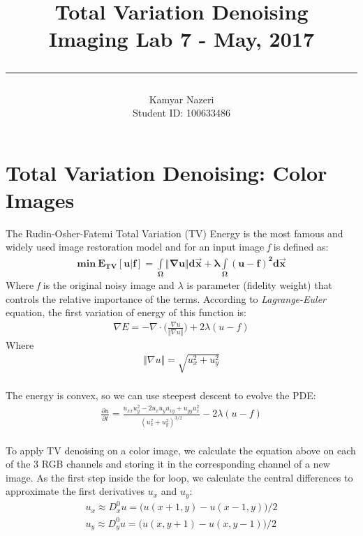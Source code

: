 \documentclass[a4paper,11pt]{article}
\begin{document}
\title{
	\Huge \textbf {Total Variation Denoising}
    \\ [0.2cm]
	\LARGE Imaging Lab 7 - May, 2017
    \\ [0.5cm]
    \hrule
}

\date{}

\author{
		\Large Kamyar Nazeri \\
		\large Student ID: 100633486 }

\maketitle
\newpage

\section*{Total Variation Denoising: Color Images}
The Rudin-Osher-Fatemi Total Variation (TV) Energy is the most famous and widely used image restoration model and for an input image \emph{f} is defined as:
\begin{align*}
\boldsymbol{min\ E_{TV}[u|f] = \int\limits_{\Omega} \Vert\nabla u\Vert d\vec{x} + \lambda \int\limits_{\Omega} (u-f)^2 d\vec{x}}
\end{align*}
Where \emph{f} is the original noisy image and $\lambda$ is parameter (fidelity weight) that controls the relative importance of the terms.
According to \emph{Lagrange-Euler} equation, the first variation of energy of this function is:
\begin{align*}
\nabla E = -\nabla \cdot \bigg(\frac{\nabla u}{\Vert\nabla u\Vert}\bigg) + 2\lambda(u-f)
\end{align*}
Where
\begin{align*}
\Vert\nabla u\Vert = \sqrt{u_x^2 + u_y^2}
\end{align*}
\\The energy is convex, so we can use steepest descent to evolve the PDE:
\begin{align*}
\frac{\partial u}{\partial t} = \frac{u_{xx} u_y^2 - 2 u_x u_y u_{xy} + u_{yy} u_x^2}{(u_x^2 + u_y^2)^{3/2}} - 2 \lambda(u-f)
\end{align*}
 \\
To apply TV denoising on a color image, we calculate the equation above on each of the 3 RGB channels and storing it in the corresponding channel of a new image. As the first step inside the for loop, we calculate the central differences to approximate the first
derivatives $u_x$ and $u_y$:
\begin{align*}
u_x \approx D_x^{0}u = \big(u(x+1,y)-u(x-1,y)\big)/2 \\
u_y \approx D_y^{0}u = \big(u(x,y+1)-u(x,y-1)\big)/2 \\
\end{align*}
\end{document}
